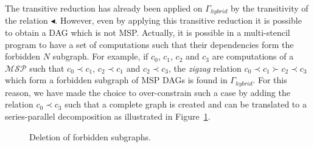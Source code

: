 The transitive reduction has already been applied on $\Gamma_{hybrid}$ by the transitivity of the relation $\blacktriangleleft$. However, even by applying this transitive reduction it is possible to obtain a DAG which is not MSP. Actually, it is possible in a multi-stencil program to have a set of computations such that their dependencies form the forbidden $N$ subgraph. For example, if $c_0$, $c_1$, $c_2$ and $c_3$ are computations of a $\mathcal{MSP}$ such that $c_0 \prec c_1$, $c_2 \prec c_1$ and $c_2 \prec c_3$, the \emph{zigzag} relation $c_0 \prec c_1 \succ c_2 \prec c_3$ which form a forbidden subgraph of MSP DAGs is found in $\Gamma_{hybrid}$. For this reason, we have made the choice to over-constrain such a case by adding the relation $c_0 \prec c_3$ such that a complete graph is created and can be translated to a series-parallel decomposition as illustrated in Figure~\ref{fig:allover}.

\begin{figure}[h!]
\begin{center}
\hspace{50pt}
\caption{Deletion of forbidden subgraphs.}
\label{fig:allover}
\end{center}
\end{figure}


